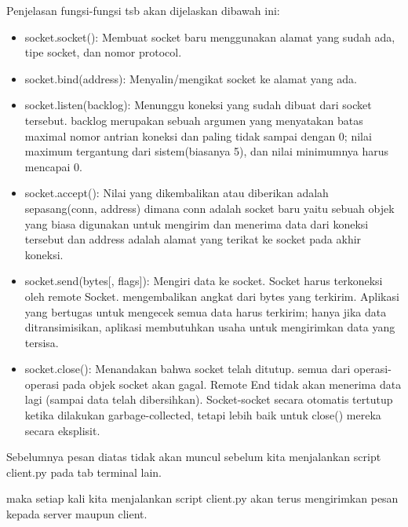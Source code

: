\vspace{12pt}
\noindent 
Penjelasan fungsi-fungsi tsb akan dijelaskan dibawah ini: \par
\noindent 
\begin{itemize}
\item socket.socket(): Membuat socket baru menggunakan alamat yang sudah ada, tipe socket, dan nomor protocol. \par
\noindent 
\item socket.bind(address): Menyalin/mengikat socket ke alamat yang ada. \par
\noindent 
\item socket.listen(backlog): Menunggu koneksi yang sudah dibuat dari socket tersebut. backlog merupakan sebuah argumen yang menyatakan batas maximal nomor antrian koneksi dan paling tidak sampai dengan 0; nilai maximum tergantung dari sistem(biasanya 5), dan nilai minimumnya harus mencapai 0. \par
\noindent 
\item socket.accept(): Nilai yang dikembalikan atau diberikan adalah sepasang(conn, address) dimana conn adalah socket baru yaitu sebuah objek yang biasa digunakan untuk mengirim dan menerima data dari koneksi tersebut dan address adalah alamat yang terikat ke socket pada akhir koneksi. \par
\noindent 
\item socket.send(bytes[, flags]): Mengiri data ke socket. Socket harus terkoneksi oleh remote Socket. mengembalikan angkat dari bytes yang terkirim. Aplikasi yang bertugas untuk mengecek semua data harus terkirim; hanya jika data ditransimisikan, aplikasi membutuhkan usaha untuk mengirimkan data yang tersisa. \par
\noindent 
\item socket.close(): Menandakan bahwa socket telah ditutup. semua dari operasi-operasi pada objek socket akan gagal. Remote End tidak akan menerima data lagi (sampai data telah dibersihkan). Socket-socket secara otomatis tertutup ketika dilakukan garbage-collected, tetapi lebih baik untuk close() mereka secara eksplisit.\end{itemize}
 \par
\vspace{12pt}
Sebelumnya pesan diatas tidak akan muncul sebelum kita menjalankan script client.py pada tab terminal lain. \par
maka setiap kali kita menjalankan script client.py akan terus mengirimkan pesan kepada server maupun client. \par
\noindent 
\vspace{12pt}
